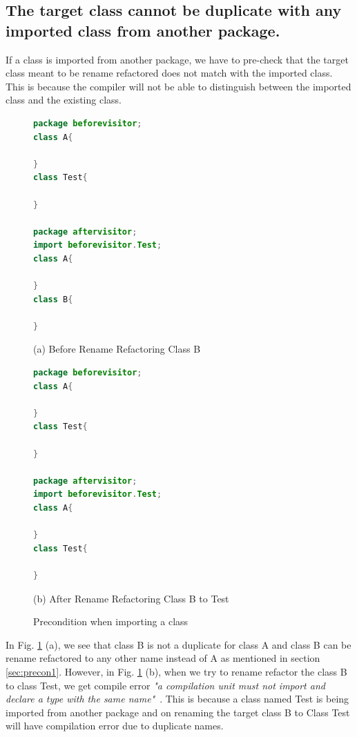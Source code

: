 \subsection{The target class cannot be duplicate with any imported class from another package.}

If a class is imported from another package, we have to pre-check that the target class meant to be rename refactored does not match with the imported class. This is because the compiler will not be able to distinguish between the imported class and the existing class. 

\begin{figure}[th]
\centering
\begin{minipage}[t]{0.6\linewidth}
\begin{lstlisting}[language=java, basicstyle=\scriptsize\ttfamily,frame=single]
package beforevisitor;
class A{
    
}	
class Test{

}

package aftervisitor;
import beforevisitor.Test;
class A{

}
class B{

} 

\end{lstlisting}
\tiny{(a) Before Rename Refactoring Class B}
\end{minipage}
\hfill

\begin{minipage}[t]{0.6\linewidth}
\begin{lstlisting}[language=java, basicstyle=\scriptsize\ttfamily,frame=single]
package beforevisitor;
class A{
    
}	
class Test{

}

package aftervisitor;
import beforevisitor.Test;
class A{

}
class Test{

} 
\end{lstlisting}
\tiny{(b) After Rename Refactoring Class B to Test}
\end{minipage}
\caption{Precondition when importing a class}
\label{figure:fig2}
\end{figure}

In Fig. \ref{figure:fig2} (a), we see that class B is not a duplicate for class A and class B can be rename refactored to any other name instead of A as mentioned in section \ref{sec:precon1}. However, in Fig. \ref{figure:fig2} (b), when we try to rename refactor the class B to class Test, we get compile error \textit{"a compilation unit must not import and declare a type with the same name"}~\cite{EclipseWebPage}. 
This is because a class named Test is being imported from another package and on renaming the target class B to Class Test will have compilation error due to duplicate names. 

